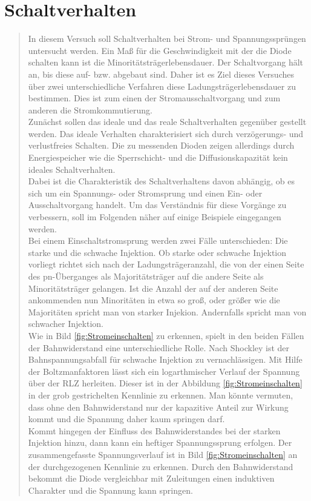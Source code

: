 \section{Schaltverhalten}
\begin{quote}

In diesem Versuch soll Schaltverhalten bei Strom- und Spannungssprüngen untersucht werden.
Ein Maß für die Geschwindigkeit mit der die Diode schalten kann ist die Minoritätsträgerlebensdauer.
Der Schaltvorgang hält an, bis diese auf- bzw. abgebaut sind. Daher ist es Ziel dieses Versuches über
zwei unterschiedliche Verfahren diese Ladungsträgerlebensdauer zu bestimmen. Dies ist zum einen der
Stromausschaltvorgang und zum anderen die Stromkommutierung.\\

Zunächst sollen das ideale und das reale Schaltverhalten gegenüber gestellt werden. Das ideale Verhalten
charakterisiert sich durch verzögerungs- und verlustfreies Schalten. Die zu messenden Dioden zeigen allerdings 
durch Energiespeicher wie die Sperrschicht- und die Diffusionskapazität kein ideales Schaltverhalten. \\

Dabei ist die Charakteristik des Schaltverhaltens davon abhängig, ob es sich um ein Spannungs- oder Stromsprung 
und einen Ein- oder Ausschaltvorgang handelt. Um das Verständnis für diese Vorgänge zu verbessern, soll im Folgenden 
näher auf einige Beispiele eingegangen werden.\\

Bei einem Einschaltstromsprung werden zwei Fälle unterschieden: Die starke und die schwache Injektion. Ob starke oder 
schwache Injektion vorliegt richtet sich nach der Ladungsträgeranzahl, die von der einen Seite des pn-Überganges als 
Majoritätsträger auf die andere Seite als Minoritätsträger gelangen. Ist die Anzahl der auf der anderen Seite 
ankommenden nun Minoritäten in etwa so groß, oder größer wie die Majoritäten spricht man von starker Injekion.
Andernfalls spricht man von schwacher Injektion.\\
Wie in Bild \ref{fig:Stromeinschalten} zu erkennen, spielt in den beiden Fällen der Bahnwiderstand eine
unterschiedliche Rolle. Nach Shockley ist der Bahnspannungsabfall für schwache Injektion zu vernachlässigen. 
Mit Hilfe der Boltzmanfaktoren lässt sich ein logarthmischer Verlauf der Spannung über der RLZ herleiten. 
Dieser ist in der Abbildung \ref{fig:Stromeinschalten} in der grob gestrichelten Kennlinie zu erkennen. 
Man könnte vermuten, dass ohne den Bahnwiderstand nur der kapazitive Anteil zur Wirkung kommt und die Spannung 
daher kaum springen darf.\\
Kommt hingegen der Einfluss des Bahnwiderstandes bei der starken Injektion hinzu, dann kann ein heftiger 
Spannungssprung erfolgen. Der zusammengefasste Spannungsverlauf ist in Bild \ref{fig:Stromeinschalten} an der 
durchgezogenen Kennlinie zu erkennen. Durch den Bahnwiderstand bekommt die Diode vergleichbar mit Zuleitungen
einen induktiven Charakter und die Spannung kann springen.


\end{quote}
